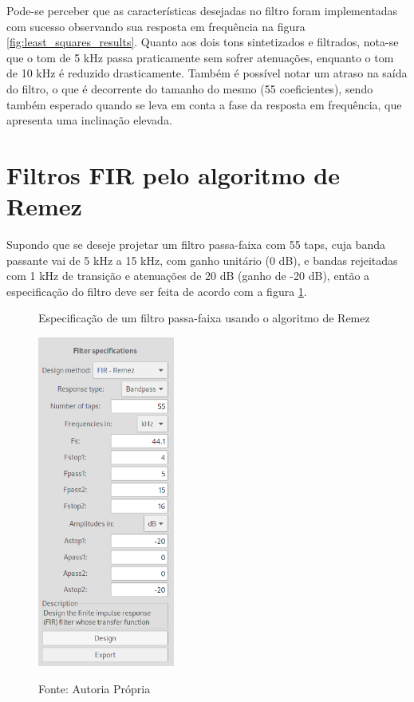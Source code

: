 \documentclass[12pt,a4paper]{report}
\begin{document}
  Pode-se perceber que as características desejadas no filtro foram implementadas com sucesso observando sua resposta
  em frequência na figura \ref{fig:least_squares_results}. Quanto aos dois tons sintetizados e filtrados, nota-se que
  o tom de 5 kHz passa praticamente sem sofrer atenuações, enquanto o tom de 10 kHz é reduzido drasticamente. Também
  é possível notar um atraso na saída do filtro, o que é decorrente do tamanho do mesmo (55 coeficientes), sendo
  também esperado quando se leva em conta a fase da resposta em frequência, que apresenta uma inclinação elevada.

\section{Filtros FIR pelo algoritmo de Remez}
  Supondo que se deseje projetar um filtro passa-faixa com 55 taps, cuja banda passante vai de 5 kHz a 15 kHz,
  com ganho unitário (0 dB), e bandas rejeitadas com 1 kHz de transição e atenuações de 20 dB (ganho de -20 dB),
  então a especificação do filtro deve ser feita de acordo com a figura \ref{fig:remez_specifications}.
  \begin{figure}[H]
    \caption{Especificação de um filtro passa-faixa usando o algoritmo de Remez}
    \centering
    \includegraphics[width=0.4\textwidth]{images/remez_specifications}
    \label{fig:remez_specifications}
    \caption*{Fonte: Autoria Própria}
  \end{figure}
\end{document}
